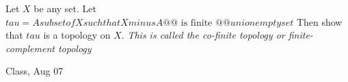 \begin{samepage}
\begin{ex}
Let $X$ be any set. Let 
$tau = {{ A subset of X such that X minus A @@\text{ is finite }@@ }} union {{ empty set }} $
Then show that $tau$ is a topology on $X$.
\vspace{0.5cm}
\textit{This is called the co-finite topology or finite-complement topology}
\end{ex}
\begin{source}
Class, Aug 07
\end{source}
\end{samepage}
